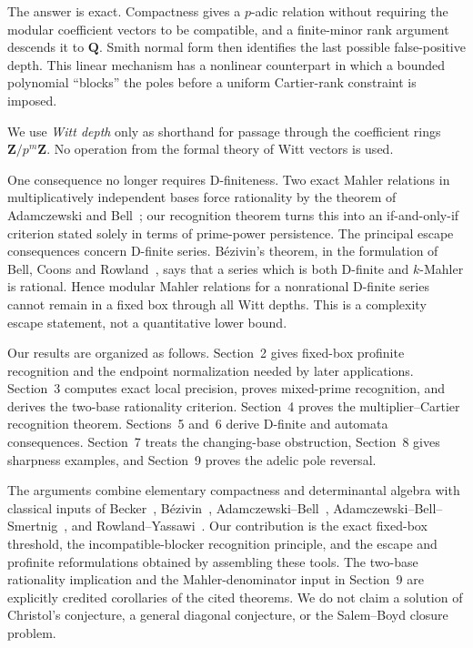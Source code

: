 \documentclass[11pt,reqno]{amsart}
\theoremstyle{definition}
\theoremstyle{remark}
\newcommand{\Q}{\mathbf Q}
\newcommand{\Z}{\mathbf Z}
\begin{document}
The answer is exact.  Compactness gives a $p$-adic relation without requiring
the modular coefficient vectors to be compatible, and a finite-minor rank
argument descends it to $\Q$.  Smith normal form then identifies the last
possible false-positive depth.  This linear mechanism has a nonlinear
counterpart in which a bounded polynomial ``blocks'' the poles before a
uniform Cartier-rank constraint is imposed.

We use \emph{Witt depth} only as shorthand for passage through the coefficient
rings $\Z/p^m\Z$.  No operation from the formal theory of Witt vectors is
used.

One consequence no longer requires D-finiteness.  Two exact Mahler
relations in multiplicatively independent bases force rationality by the
theorem of Adamczewski and Bell~\cite{abtwobase}; our recognition theorem
turns this into an if-and-only-if criterion stated solely in terms of
prime-power persistence.  The principal escape consequences concern
D-finite series.  B\'ezivin's theorem,
in the formulation of Bell, Coons and Rowland~\cite{bcr}, says that a series
which is both D-finite and $k$-Mahler is rational.  Hence modular Mahler
relations for a nonrational D-finite series cannot remain in a fixed box
through all Witt depths.  This is a complexity escape statement, not a
quantitative lower bound.

Our results are organized as follows.  Section~2 gives fixed-box profinite
recognition and the endpoint normalization needed by later applications.
Section~3 computes exact local precision, proves mixed-prime recognition,
and derives the two-base rationality criterion.  Section~4 proves the
multiplier--Cartier recognition theorem.  Sections~5 and~6 derive D-finite
and automata consequences.  Section~7 treats the changing-base obstruction,
Section~8 gives sharpness examples, and Section~9 proves the adelic pole
reversal.

The arguments combine elementary compactness and determinantal algebra with
classical inputs of Becker~\cite{becker}, B\'ezivin~\cite{bezivin},
Adamczewski--Bell~\cite{abtwobase}, Adamczewski--Bell--Smertnig~\cite{abs},
and Rowland--Yassawi~\cite{profinite,rowlandyassawi}.  Our contribution is
the exact fixed-box threshold, the incompatible-blocker recognition
principle, and the escape and profinite reformulations obtained by assembling
these tools.  The two-base rationality implication and the Mahler-denominator
input in Section~9 are explicitly credited corollaries of the cited
theorems.  We do not claim a solution of Christol's conjecture, a general
diagonal conjecture, or the Salem--Boyd closure problem.
\end{document}
